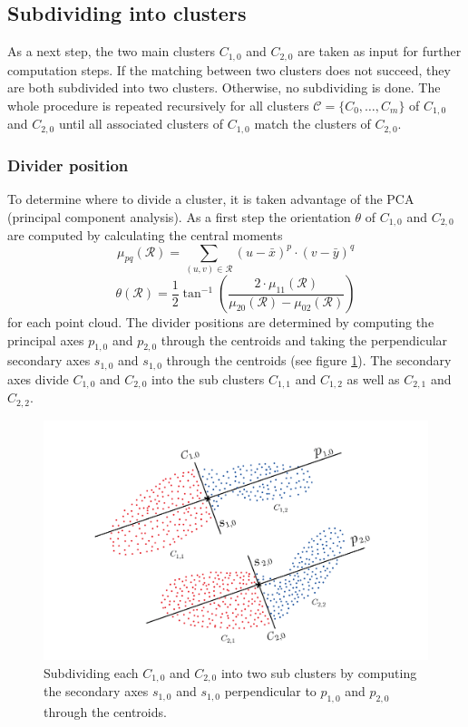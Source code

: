 \documentclass[notitlepage,english]{hgbreport}
\begin{document}
	\subsection{Subdividing into clusters}
	
	As a next step, the two main clusters $C_{1,0}$ and $C_{2,0}$ are taken as input for further computation steps. If the matching between two clusters does not succeed, they are both subdivided into two clusters. Otherwise, no subdividing is done. The whole procedure is repeated recursively for all clusters $\mathcal{C} = \{C_0, \ldots, C_m\}$ of $C_{1,0}$ and $C_{2,0}$ until all associated clusters of $C_{1,0}$ match the clusters of $C_{2,0}$.  
	
	\subsubsection{Divider position}
	
	To determine where to divide a cluster, it is taken advantage of the PCA (principal component analysis). As a first step the orientation $\theta$ of $C_{1,0}$ and $C_{2,0}$ are computed by calculating the central moments
	\begin{equation}
	\mu_{pq}(\mathcal{R}) = \sum_{(u,v)\in\mathcal{R}} (u - \bar{x})^p \cdot (v - \bar{y})^q
	\end{equation}
	\begin{equation}
	\theta(\mathcal{R}) = \frac{1}{2} \tan^{-1} \left(\frac{2\cdot \mu_{11}(\mathcal{R})}{\mu_{20}(\mathcal{R}) - \mu_{02}(\mathcal{R})}\right)
	\end{equation}
	for each point cloud.	
	The divider positions are determined by computing the principal axes $p_{1,0}$ and $p_{2,0}$ through the centroids and taking the perpendicular secondary axes $s_{1,0}$ and $s_{1,0}$ through the centroids (see figure \ref{fig:dc_axes_2p}). The secondary axes divide $C_{1,0}$ and $C_{2,0}$ into the sub clusters $C_{1,1}$ and $C_{1,2}$ as well as $C_{2,1}$ and $C_{2,2}$.
	
	\begin{figure}
		\centering
		\includegraphics[width=0.7\linewidth]{illustration_axes}
		\caption{Subdividing each $C_{1,0}$ and $C_{2,0}$ into two sub clusters by computing the secondary axes $s_{1,0}$ and $s_{1,0}$ perpendicular to $p_{1,0}$ and $p_{2,0}$ through the centroids.}
		\label{fig:dc_axes_2p}
	\end{figure}
	
\end{document}
